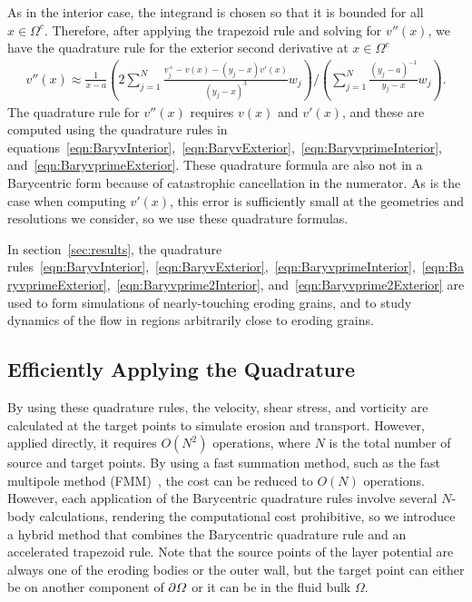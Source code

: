 \documentclass{jfm}
\begin{document}
As in the interior case, the integrand is chosen so that it is bounded
for all $x \in \Omega^c$.  Therefore, after applying the trapezoid rule
and solving for $v''(x)$, we have the quadrature rule for the exterior
second derivative at $x \in \Omega^c$
\begin{align}
  v''(x) \approx \frac{1}{x-a}\left(2\sum\limits_{j=1}^N
    \frac{v^{+}_{j} - v(x) - (y_j-x)v'(x)}{(y_j-x)^3}w_j\right)
    \Bigg/
    \left(\sum_{j=1}^N \frac{(y_j-a)^{-1}}{y_j-x}w_j\right).
    \label{eqn:Baryvprime2Exterior}
\end{align}
The quadrature rule for $v''(x)$ requires $v(x)$ and $v'(x)$, and these
are computed using the quadrature rules in
equations~\eqref{eqn:BaryvInterior},~\eqref{eqn:BaryvExterior},~\eqref{eqn:BaryvprimeInterior},
and~\eqref{eqn:BaryvprimeExterior}. These quadrature formula are also
not in a Barycentric form because of catastrophic cancellation in the
numerator. As is the case when computing $v'(x)$, this error is
sufficiently small at the geometries and resolutions we consider, so we
use these quadrature formulas.

In section~\ref{sec:results}, the quadrature
rules~\eqref{eqn:BaryvInterior},~\eqref{eqn:BaryvExterior},~\eqref{eqn:BaryvprimeInterior},~\eqref{eqn:BaryvprimeExterior},~\eqref{eqn:Baryvprime2Interior},
and~\eqref{eqn:Baryvprime2Exterior} are used to form simulations of
nearly-touching eroding grains, and to study dynamics of the flow in
regions arbitrarily close to eroding grains.

\subsection{Efficiently Applying the Quadrature}
\label{sec:fmm}
By using these quadrature rules, the velocity, shear stress, and
vorticity are calculated at the target points to simulate erosion and
transport. However, applied directly, it requires $O(N^2)$ operations,
where $N$ is the total number of source and target points.  By using a
fast summation method, such as the fast multipole method
(FMM)~\citep{gre-rok1987}, the cost can be reduced to $O(N)$ operations.
However, each application of the Barycentric quadrature rules involve
several $N$-body calculations, rendering the computational cost
prohibitive, so we introduce a hybrid method that combines the
Barycentric quadrature rule and an accelerated trapezoid rule.  Note
that the source points of the layer potential are always one of the
eroding bodies or the outer wall, but the target point can either be on
another component of ${\partial}\varOmega$ or it can be in the fluid bulk
$\Omega$.
\end{document}
